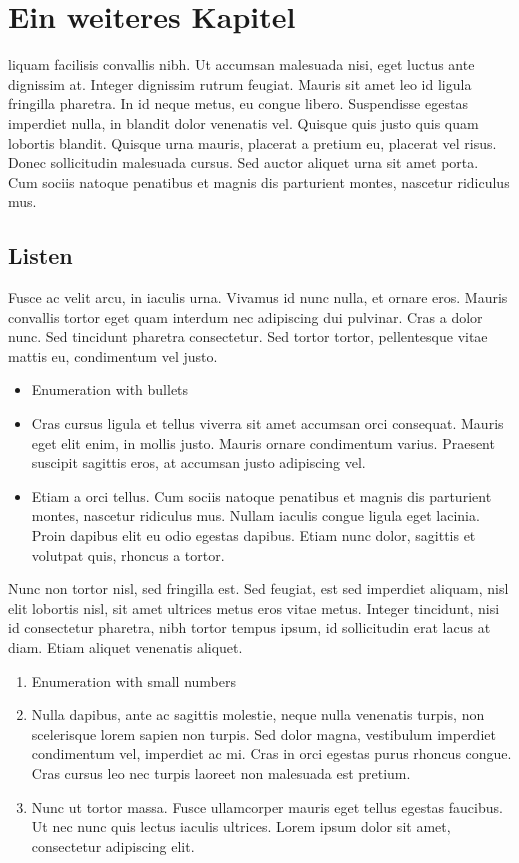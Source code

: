 \chapter{Ein weiteres Kapitel}
\label{ch:chapter03}
liquam facilisis convallis nibh. Ut accumsan malesuada nisi, eget luctus ante dignissim at. Integer dignissim rutrum feugiat. Mauris sit amet leo id ligula fringilla pharetra. In id neque metus, eu congue libero. Suspendisse egestas imperdiet nulla, in blandit dolor venenatis vel. Quisque quis justo quis quam lobortis blandit. Quisque urna mauris, placerat a pretium eu, placerat vel risus. Donec sollicitudin malesuada cursus. Sed auctor aliquet urna sit amet porta. Cum sociis natoque penatibus et magnis dis parturient montes, nascetur ridiculus mus.

%
%
\section{Listen}
\label{sec:chapter03:listen}
Fusce ac velit arcu, in iaculis urna. Vivamus id nunc nulla, et ornare eros. Mauris convallis tortor eget quam interdum nec adipiscing dui pulvinar. Cras a dolor nunc. Sed tincidunt pharetra consectetur. Sed tortor tortor, pellentesque vitae mattis eu, condimentum vel justo.

\begin{itemize}
 \item Enumeration with bullets
 \item Cras cursus ligula et tellus viverra sit amet accumsan orci consequat. Mauris eget elit enim, in mollis justo. Mauris ornare condimentum varius. Praesent suscipit sagittis eros, at accumsan justo adipiscing vel.
 \item Etiam a orci tellus. Cum sociis natoque penatibus et magnis dis parturient montes, nascetur ridiculus mus. Nullam iaculis congue ligula eget lacinia. Proin dapibus elit eu odio egestas dapibus. Etiam nunc dolor, sagittis et volutpat quis, rhoncus a tortor.
\end{itemize}

Nunc non tortor nisl, sed fringilla est. Sed feugiat, est sed imperdiet aliquam, nisl elit lobortis nisl, sit amet ultrices metus eros vitae metus. Integer tincidunt, nisi id consectetur pharetra, nibh tortor tempus ipsum, id sollicitudin erat lacus at diam. Etiam aliquet venenatis aliquet.

\begin{enumerate}
 \item Enumeration with small numbers
 \item Nulla dapibus, ante ac sagittis molestie, neque nulla venenatis turpis, non scelerisque lorem sapien non turpis. Sed dolor magna, vestibulum imperdiet condimentum vel, imperdiet ac mi. Cras in orci egestas purus rhoncus congue. Cras cursus leo nec turpis laoreet non malesuada est pretium.
 \item Nunc ut tortor massa. Fusce ullamcorper mauris eget tellus egestas faucibus. Ut nec nunc quis lectus iaculis ultrices. Lorem ipsum dolor sit amet, consectetur adipiscing elit.
\end{enumerate}

